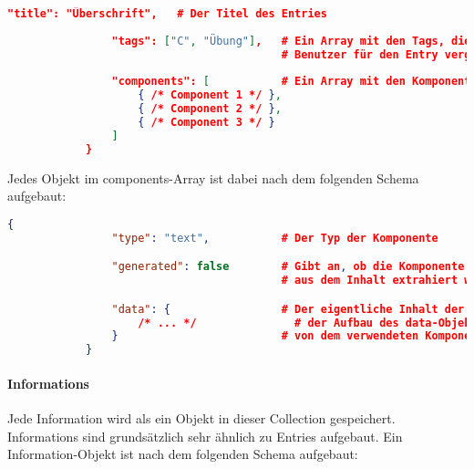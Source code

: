 \begin{lstlisting}[language=JSON]
				"title": "Überschrift",   # Der Titel des Entries
				
				"tags": ["C", "Übung"],   # Ein Array mit den Tags, die der 
				                          # Benutzer für den Entry vergeben hat.
				
				"components": [           # Ein Array mit den Komponenten des Entry
					{ /* Component 1 */ },
					{ /* Component 2 */ },
					{ /* Component 3 */ }
				]
			}
		\end{lstlisting}

		Jedes Objekt im components-Array ist dabei nach dem folgenden Schema aufgebaut:

		\begin{lstlisting}[language=JSON]
			{
				"type": "text",           # Der Typ der Komponente

				"generated": false        # Gibt an, ob die Komponente von Norbert
				                          # aus dem Inhalt extrahiert wurde.

				"data": {                 # Der eigentliche Inhalt der Komponente.
					/* ... */               # der Aufbau des data-Objekts ist abhängig
				}                         # von dem verwendeten Komponenten-Typ.
			}
		\end{lstlisting}
	\paragraph{Informations} %
	\label{par:informations}
		
		Jede Information wird als ein Objekt in dieser Collection gespeichert. Informations sind grundsätzlich sehr ähnlich zu Entries aufgebaut. Ein Information-Objekt ist nach dem folgenden Schema aufgebaut:

